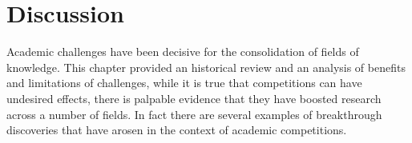 \documentclass[twoside,11pt]{article}
\begin{document}

























\section{Discussion}
\label{sec:discussion7}
Academic challenges have been decisive for the consolidation of fields of knowledge. This chapter provided an historical review and an analysis of benefits and limitations of challenges, while it is true that competitions can have undesired effects, there is palpable evidence that they have boosted research across a number of fields. In fact there are several examples of breakthrough discoveries that have arosen in the context of academic competitions.  
\end{document}
